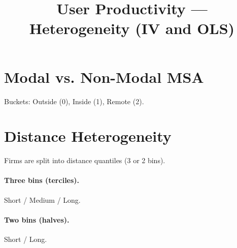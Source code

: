 \documentclass[11pt]{article}
\title{User Productivity — Heterogeneity (IV and OLS)}
\date{}
\begin{document}
\maketitle
\section*{Modal vs. Non-Modal MSA}
Buckets: Outside (0), Inside (1), Remote (2).


\section*{Distance Heterogeneity}
Firms are split into distance quantiles (3 or 2 bins).
\paragraph{Three bins (terciles).} Short / Medium / Long.


\paragraph{Two bins (halves).} Short / Long.


\end{document}
